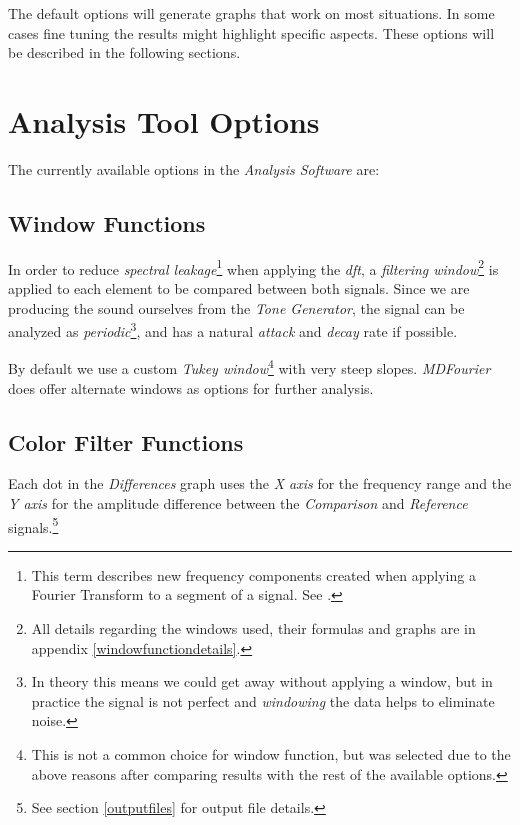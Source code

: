 \documentclass[10pt,a4paper]{report}
\newcommand{\ac}[1]{\textit{\acrshort{#1}}}
\begin{document}
\begin{appendices}
The default options will generate graphs that work on most situations. In some cases fine tuning the results might highlight specific aspects. These options will be described in the following sections.

\section{Analysis Tool Options}

The currently available options in the \textit{Analysis Software} are:

\subsection{Window Functions}
\label{windows}

In order to reduce \textit{spectral leakage}\footnote{This term describes new frequency components created when applying a Fourier Transform to a segment of a signal. See \cite{leakage}.} when applying the \ac{dft}, a \textit{filtering window}\footnote{All details regarding the windows used, their formulas and graphs are in appendix \ref{windowfunctiondetails}.} is applied to each element to be compared between both signals. Since we are producing the sound ourselves from the \textit{Tone Generator}, the signal can be analyzed as \textit{periodic}\footnote{In theory this means we could get away without applying a window, but in practice the signal is not perfect and \textit{windowing} the data helps to eliminate noise.}, and has a natural \textit{attack} and \textit{decay} rate if possible.

By default we use a custom \textit{Tukey window}\footnote{This is not a common choice for window function, but was selected due to the above reasons after comparing results with  the rest of the available options.} with very steep slopes. \textit{MDFourier} does offer alternate windows as options for further analysis.

\subsection{Color Filter Functions}
\label{colorfilter}

Each dot in the \textit{Differences} graph uses the \textit{X axis} for the frequency range and the \textit{Y axis} for the amplitude difference between the \textit{Comparison} and \textit{Reference} signals.\footnote{See section \ref{outputfiles} for output file details.}


\end{appendices}
\end{document}
